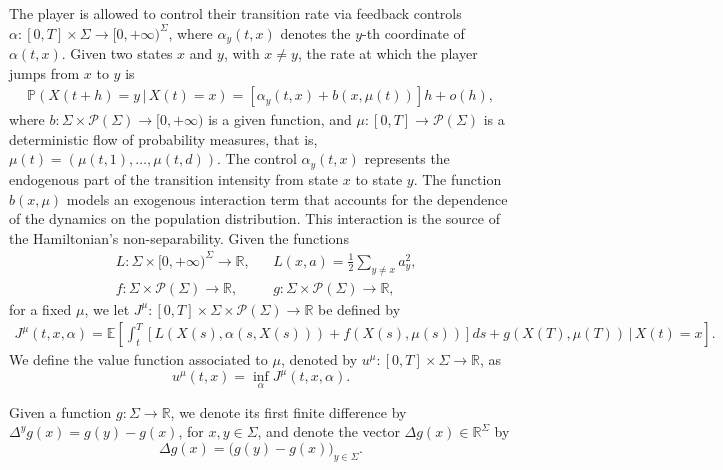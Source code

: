\documentclass[11pt,a4paper]{amsart}
\theoremstyle{definition}
\newcommand{\calP}{\mathcal{P}}
\newcommand{\E}{\mathbb{E}}
\renewcommand{\P}{\mathbb{P}}
\newcommand{\R}{\mathbb{R}}
\begin{document}
The player is allowed to control their transition rate via feedback controls $\alpha \colon [0,T] \times \Sigma \to [0,+\infty)^{\Sigma}$, where $\alpha_y(t,x)$ denotes the $y$-th coordinate of $\alpha(t,x)$.
Given two states $x$ and $y$, with $x \neq y$, the rate at which the player jumps from $x$ to $y$ is
\begin{align*}
    \P(X(t+h) = y \,|\, X(t) = x)
    = [\alpha_{y}(t,x) + b(x,\mu(t))]h + o(h),
\end{align*}
where $b \colon \Sigma \times \calP(\Sigma) \to [0,+\infty)$ is a given function, and $\mu \colon [0,T] \to \calP(\Sigma)$ is a deterministic flow of probability measures, that is, 
$\mu(t)= (\mu(t,1), \dots, \mu(t,d))$.
The control $\alpha_y(t,x)$ represents the endogenous part of the transition intensity from state $x$ to state $y$. The function $b(x,\mu)$ models an exogenous interaction term that accounts for the dependence of the dynamics on the population distribution. This interaction is the source of the Hamiltonian's non-separability.
Given the functions
\begin{align*}
    &L \colon \Sigma \times [0,+\infty)^{\Sigma} \to \R, 
&&L(x,a) = \frac{1}{2} \sum_{y \neq x} a_{y}^2, 
    \\
    &f \colon \Sigma \times \calP(\Sigma) \to \R,
    &&g \colon \Sigma \times \calP(\Sigma) \to \R, 
\end{align*}
for a fixed $\mu$, we let $J^\mu \colon [0,T] \times \Sigma \times \calP(\Sigma) \to \R$ be defined by
\begin{align*}
    J^\mu(t,x,\alpha) = \E\left[\int_{t}^{T}[L(X(s),\alpha(s,X(s))) + f(X(s),\mu(s))]ds + g(X(T),\mu(T)) \,\Big|\, X(t)=x \right].
\end{align*}
We define the value function associated to $\mu$, denoted by $u^\mu \colon [0,T] \times \Sigma \to \R$, as
\begin{equation}
    u^\mu(t,x) = \inf_{\alpha} J^\mu(t,x,\alpha).
\end{equation}


Given a function $g : \Sigma \to \R$, we denote its first finite difference by
$\Delta^yg(x)= g(y)-g(x)$, for $x,y\in\Sigma$, and denote the vector $\Delta g(x) \in \R^\Sigma$ by
\begin{equation*}
    \Delta g(x) = \big( g(y)-g(x) \big)_{y\in\Sigma}.
\end{equation*}
\end{document}
